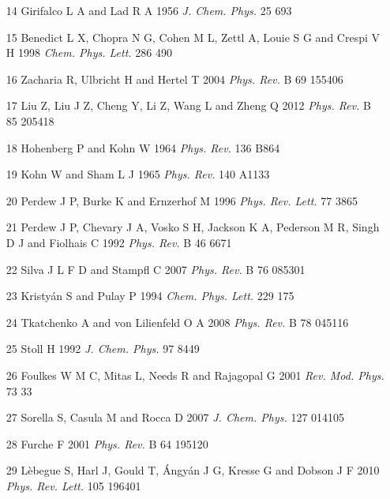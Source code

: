 \documentclass{article}
\begin{document}
\begin{itemize}
\item 
[14] Girifalco L A and Lad R A 1956 \textit{J. Chem. Phys.} 25 693

\item 
[15] Benedict L X, Chopra N G, Cohen M L, Zettl A, Louie S G and Crespi V H 1998 \textit{Chem. Phys. Lett.} 286 490

\item 
[16] Zacharia R, Ulbricht H and Hertel T 2004 \textit{Phys. Rev.} B 69 155406

\item 
[17] Liu Z, Liu J Z, Cheng Y, Li Z, Wang L and Zheng Q 2012 \textit{Phys. Rev.} B 85 205418

\item 
[18] Hohenberg P and Kohn W 1964 \textit{Phys. Rev.} 136 B864

\item 
[19] Kohn W and Sham L J 1965 \textit{Phys. Rev.} 140 A1133

\item 
[20] Perdew J P, Burke K and Ernzerhof M 1996 \textit{Phys. Rev. Lett.} 77 3865

\item 
[21] Perdew J P, Chevary J A, Vosko S H, Jackson K A, Pederson M R, Singh D J and Fiolhais C 1992 \textit{Phys. Rev.} B 46 6671

\item 
[22] Silva J L F D and Stampfl C 2007 \textit{Phys. Rev.} B 76 085301

\item 
[23] Kristyán S and Pulay P 1994 \textit{Chem. Phys. Lett.} 229 175

\item 
[24] Tkatchenko A and von Lilienfeld O A 2008 \textit{Phys. Rev.} B 78 045116

\item 
[25] Stoll H 1992 \textit{J. Chem. Phys.} 97 8449

\item 
[26] Foulkes W M C, Mitas L, Needs R and Rajagopal G 2001 \textit{Rev. Mod. Phys.} 73 33

\item 
[27] Sorella S, Casula M and Rocca D 2007 \textit{J. Chem. Phys.} 127 014105

\item 
[28] Furche F 2001 \textit{Phys. Rev.} B 64 195120

\item 
[29] Lèbegue S, Harl J, Gould T, Ángyán J G, Kresse G and Dobson J F 2010 \textit{Phys. Rev. Lett.} 105 196401


\end{itemize}
\end{document}
